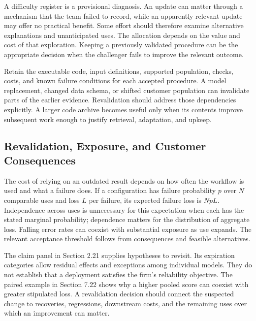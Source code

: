 A difficulty register is a provisional diagnosis. An update can matter
through a mechanism that the team failed to record, while an apparently
relevant update may offer no practical benefit. Some effort should
therefore examine alternative explanations and unanticipated uses. The
allocation depends on the value and cost of that exploration. Keeping a
previously validated procedure can be the appropriate decision when the
challenger fails to improve the relevant outcome.

Retain the executable code, input definitions, supported population,
checks, costs, and known failure conditions for each accepted procedure.
A model replacement, changed data schema, or shifted customer population
can invalidate parts of the earlier evidence. Revalidation should
address those dependencies explicitly. A larger code archive becomes
useful only when its contents improve subsequent work enough to justify
retrieval, adaptation, and upkeep.

\hypertarget{M08-revalidation-exposure-and-customer-consequences}{%
\subsection{Revalidation, Exposure, and Customer
Consequences}\label{M08-revalidation-exposure-and-customer-consequences}}

\noindent \noindent The cost of relying on an outdated result depends on how often
the workflow is used and what a failure does. If a configuration has
failure probability \(p\) over \(N\) comparable uses and loss \(L\) per
failure, its expected failure loss is \(NpL\). Independence across uses
is unnecessary for this expectation when each has the stated marginal
probability; dependence matters for the distribution of aggregate loss.
Falling error rates can coexist with substantial exposure as use
expands. The relevant acceptance threshold follows from consequences and
feasible alternatives.

The claim panel in Section 2.21 supplies hypotheses to revisit. Its
expiration categories allow residual effects and exceptions among
individual models. They do not establish that a deployment satisfies the
firm's reliability objective. The paired example in Section 7.22 shows
why a higher pooled score can coexist with greater stipulated loss. A
revalidation decision should connect the suspected change to recoveries,
regressions, downstream costs, and the remaining uses over which an
improvement can matter.

